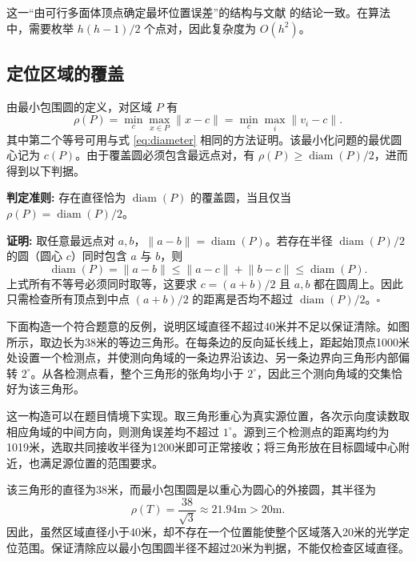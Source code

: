 \documentclass[UTF8,a4paper,zihao=-4,fontset=none]{ctexart}
\begin{document}
这一“由可行多面体顶点确定最坏位置误差”的结构与文献 \cite{Gholami2015} 的结论一致。在算法中，需要枚举 \(h(h-1)/2\) 个点对，因此复杂度为 \(O(h^2)\)。

\subsection{定位区域的覆盖}

由最小包围圆的定义，对区域 \(P\) 有
\begin{equation}
  \rho(P)=\min_c\max_{x\in P}\lVert x-c\rVert
  =\min_c\max_i\lVert v_i-c\rVert .
  \label{eq:mincircle}
\end{equation}
其中第二个等号可用与式 \eqref{eq:diameter} 相同的方法证明。该最小化问题的最优圆心记为 \(c(P)\)。由于覆盖圆必须包含最远点对，有 \(\rho(P)\ge\operatorname{diam}(P)/2\)，进而得到以下判据。

\textbf{判定准则: } 存在直径恰为 \(\operatorname{diam}(P)\) 的覆盖圆，当且仅当 \(\rho(P)=\operatorname{diam}(P)/2\)。

\textbf{证明: } 取任意最远点对 \(a,b\)，\(\lVert a-b\rVert=\operatorname{diam}(P)\)。若存在半径 \(\operatorname{diam}(P)/2\) 的圆（圆心 \(c\)）同时包含 \(a\) 与 \(b\)，则
\begin{equation}
  \operatorname{diam}(P)=\lVert a-b\rVert\le\lVert a-c\rVert+\lVert b-c\rVert\le\operatorname{diam}(P) .
\end{equation}
上式所有不等号必须同时取等，这要求 \(c=(a+b)/2\) 且 \(a,b\) 都在圆周上。因此只需检查所有顶点到中点 \((a+b)/2\) 的距离是否均不超过 \(\operatorname{diam}(P)/2\)。\(\square\)

下面构造一个符合题意的反例，说明区域直径不超过40米并不足以保证清除。如图所示，取边长为38米的等边三角形。在每条边的反向延长线上，距起始顶点1000米处设置一个检测点，并使测向角域的一条边界沿该边、另一条边界向三角形内部偏转 \(2^\circ\)。从各检测点看，整个三角形的张角均小于 \(2^\circ\)，因此三个测向角域的交集恰好为该三角形。

这一构造可以在题目情境下实现。取三角形重心为真实源位置，各次示向度读数取相应角域的中间方向，则测角误差均不超过 \(1^\circ\)。源到三个检测点的距离均约为1019米，选取共同接收半径为1200米即可正常接收；将三角形放在目标圆域中心附近，也满足源位置的范围要求。

该三角形的直径为38米，而最小包围圆是以重心为圆心的外接圆，其半径为
\begin{equation}
  \rho(T)=\frac{38}{\sqrt{3}}\approx21.94\mathrm{m}>20\mathrm{m}.
  \label{eq:counterexample}
\end{equation}
因此，虽然区域直径小于40米，却不存在一个位置能使整个区域落入20米的光学定位范围。保证清除应以最小包围圆半径不超过20米为判据，不能仅检查区域直径。
\end{document}
